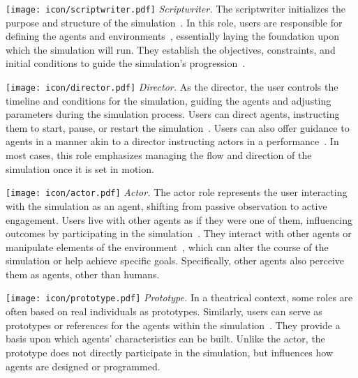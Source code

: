 \texttt{[image: icon/scriptwriter.pdf]}
\textit{Scriptwriter.} 
The scriptwriter initializes the purpose and structure of the simulation~\cite{10.1145/3526113.3545616,chan2023chatevalbetterllmbasedevaluators}. 
In this role, users are responsible for defining the agents and environments~\cite{lin2023agentsimsopensourcesandboxlarge}, essentially laying the foundation upon which the simulation will run.
They establish the objectives, constraints, and initial conditions to guide the simulation's progression~\cite{jinxin2023cgmiconfigurablegeneralmultiagent}.

\texttt{[image: icon/director.pdf]}
\textit{Director.} 
As the director, the user controls the timeline and conditions for the simulation, guiding the agents and adjusting parameters during the simulation process. 
Users can direct agents, instructing them to start, pause, or restart the simulation~\cite{chen2023agentversefacilitatingmultiagentcollaboration,ren2023robotsaskhelpuncertainty}.
Users can also offer guidance to agents in a manner akin to a director instructing actors in a performance~\cite{mehta2024improvinggroundedlanguageunderstanding,unknown,park2023choicematessupportingunfamiliaronline}.
In most cases, this role emphasizes managing the flow and direction of the simulation once it is set in motion.

\texttt{[image: icon/actor.pdf]}
\textit{Actor.}
The actor role represents the user interacting with the simulation as an agent, shifting from passive observation to active engagement.
Users live with other agents as if they were one of them, influencing outcomes by participating in the simulation~\cite{mao2024alympicsllmagentsmeet,zhou2024sotopiainteractiveevaluationsocial, NEURIPS2021_86e8f7ab}.
They interact with other agents or manipulate elements of the environment~\cite{10.1145/3586183.3606763,10.1145/3579598}, which can alter the course of the simulation or help achieve specific goals.
Specifically, other agents also perceive them as agents, other than humans.

\texttt{[image: icon/prototype.pdf]}
\textit{Prototype.} 
In a theatrical context, some roles are often based on real individuals as prototypes.
Similarly, users can serve as prototypes or references for the agents within the simulation~\cite{Argyle_Busby_Fulda_Gubler_Rytting_Wingate_2023, pmlr-v202-aher23a}.
They provide a basis upon which agents' characteristics can be built.
Unlike the actor, the prototype does not directly participate in the simulation, but influences how agents are designed or programmed.


